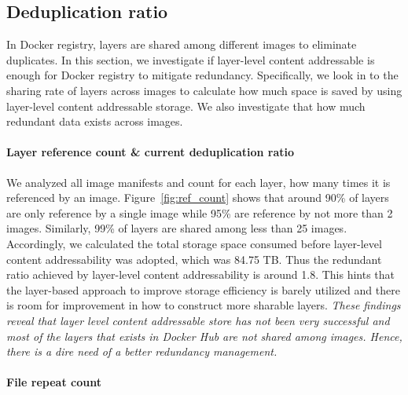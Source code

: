 \subsection{Deduplication ratio} 
\label{sec:dedup_ratio}

In Docker registry, layers are shared among different images to eliminate
duplicates.  
%
In this section, we investigate if layer-level content addressable
is enough for Docker registry to mitigate redundancy.  
%
Specifically, we look in
to the sharing rate of layers across images to calculate how much space is
saved by using layer-level content addressable storage.  
%
We also investigate
that how much redundant data exists across images.

\paragraph{Layer reference count \& current deduplication ratio}



We analyzed all image manifests and count for each layer, how many times it is
referenced by an image.
%
Figure~\ref{fig:ref_count} shows that around 90\% of layers are only reference
by a single image while 95\% are reference by not more than 2 images.
%
Similarly, 99\% of layers are shared among less than 25 images. 
%
Accordingly, we calculated the total storage space consumed before layer-level
content addressability was adopted, which was 84.75 TB.  Thus the redundant
ratio achieved by layer-level content addressability is around 1.8.
%
%
This hints that the layer-based approach to improve storage efficiency is
barely utilized and there is room for improvement in how to construct more
sharable layers.
%
\emph{These findings reveal that layer level content addressable store has not
been very successful and most of the layers that exists in Docker Hub are not
shared among images.
	Hence, there is a dire need of a better redundancy management.}

\paragraph{File repeat count}

